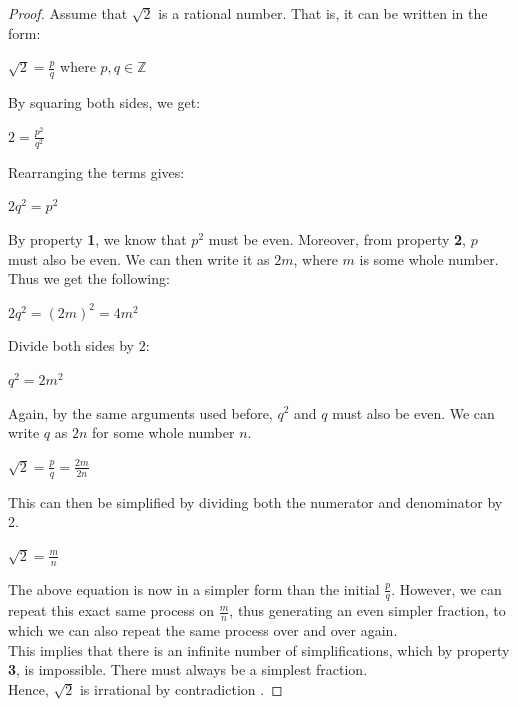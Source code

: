 \documentclass[12pt]{article}
\begin{document}
\begin{proof}
\noindent Assume that $\sqrt{2}$ is a rational number. That is, it can be written in the form:
\begin{center}
    $\sqrt{2} = \frac{p}{q}$ where $p, q \in \mathbb{Z}$
\end{center}
By squaring both sides, we get:
\begin{center}
    $2 = \frac{p^2}{q^2}$
\end{center}
Rearranging the terms gives:
\begin{center}
    $2q^2 = p^2$
\end{center}
By property \textbf{1}, we know that $p^2$ must be even. Moreover, from property \textbf{2}, $p$ must also be even. We can then write it as $2m$, where $m$ is some whole number. Thus we get the following:
\begin{center}
    $2q^2 = (2m)^2 = 4m^2$
\end{center}
Divide both sides by $2$:
\begin{center}
    $q^2 = 2m^2$
\end{center}
Again, by the same arguments used before, $q^2$ and $q$ must also be even. We can write $q$ as $2n$ for some whole number $n$.
\begin{center}
    $\sqrt{2} = \frac{p}{q} = \frac{2m}{2n}$
\end{center}
This can then be simplified by dividing both the numerator and denominator by 2.
\begin{center}
    $\sqrt{2} = \frac{m}{n}$
\end{center}
The above equation is now in a simpler form than the initial $\frac{p}{q}$. However, we can repeat this exact same process on $\frac{m}{n}$, thus generating an even simpler fraction, to which we can also repeat the same process over and over again.\\

\noindent This implies that there is an infinite number of simplifications, which by property \textbf{3}, is impossible. There must always be a simplest fraction.\\

\noindent Hence, $\sqrt{2}$ is irrational by contradiction \cite{singh1997fermat}.

\end{proof}
\end{document}
